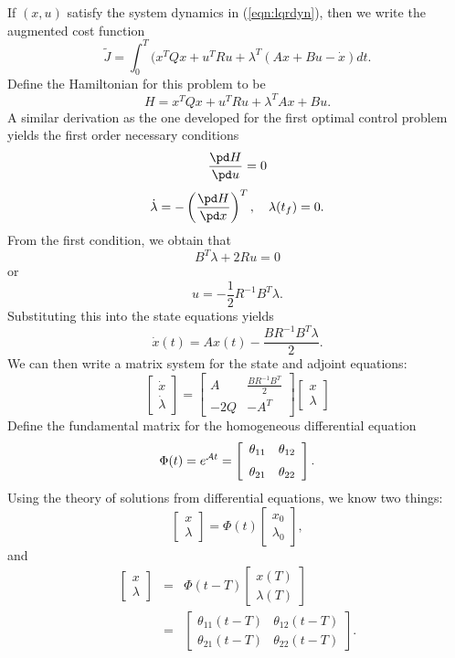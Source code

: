 If $(x,u)$ satisfy the system dynamics in (\ref{eqn:lqrdyn}), then we write the augmented cost function
$$ \tilde J = \int_0^{T} (x^TQx + u^TRu + \lambda^T(Ax + Bu  - \dot x)dt.$$
Define the Hamiltonian for this problem to be
$$H = x^TQx + u^TRu + \lambda^TAx + Bu.$$
A similar derivation as the one developed for the first optimal control problem yields the first order necessary conditions
$$\frac{\pd H}{\pd u} = 0$$
$$\dot \lambda = -\left(\frac{\pd H}{\pd x}\right)^T, \quad \lambda(t_f) = 0.$$
From the first condition, we obtain that
$$B^T\lambda + 2Ru = 0$$
or $$u = -\frac 1 2 R^{-1}B^T\lambda.$$
Substituting this into the state equations yields
$$\dot x(t) = Ax(t) - \frac{ B R^{-1}B^T\lambda}{2}.$$
We can then write a matrix system for the state and adjoint equations:
$$\left[\begin{array}{c} \dot x\\ \dot\lambda\end{array}\right] = \left[\begin{array}{cc} A &\frac{ B R^{-1}B^T}{2} \\[6pt]
-2Q & -A^T\end{array}\right]\left[\begin{array}{c} x\\ \lambda\end{array}\right]$$	
Define the fundamental matrix for the homogeneous differential equation
$$\Phi(t) = e^{{\cal A} t} =  \left[\begin{array}{cc} \theta_{11} &\theta_{12} \\[6pt]
\theta_{21} & \theta_{22}\end{array}\right].$$
Using the theory of solutions from differential equations, we know two things:
$$\left[\begin{array}{c} x\\ \lambda\end{array}\right] = \Phi(t)\left[\begin{array}{c} x_0\\ \lambda_0\end{array}\right],$$
and 
\begin{eqnarray*}
\left[\begin{array}{c} x\\ \lambda\end{array}\right]& = &\Phi(t-T)\left[\begin{array}{c} x(T)\\ \lambda(T)\end{array}\right]\\
&=&  \left[\begin{array}{cc} \theta_{11}(t-T) &\theta_{12}(t-T) \\[6pt]
\theta_{21}(t-T) & \theta_{22}(t-T)\end{array}\right].
\end{eqnarray*}
